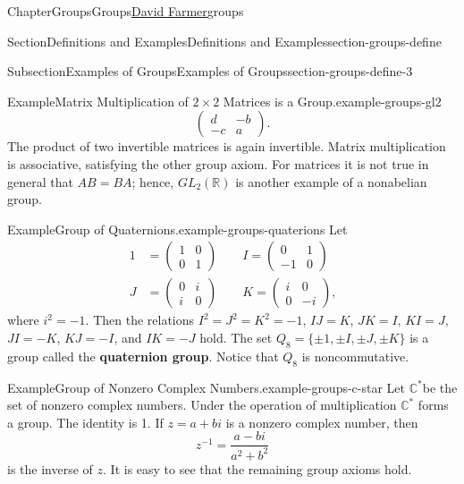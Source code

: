 \documentclass[oneside,10pt,]{book}
\newcommand{\terminology}[1]{\textbf{#1}}
\numberwithin{equation}{section}
\begin{document}
\begin{chapterptx}{Chapter}{Groups}{}{Groups}{\hyperlink{dfarmer}{David Farmer}}{}{groups}
\begin{sectionptx}{Section}{Definitions and Examples}{}{Definitions and Examples}{}{}{section-groups-define}
\begin{subsectionptx}{Subsection}{Examples of Groups}{}{Examples of Groups}{}{}{section-groups-define-3}
\begin{example}{Example}{Matrix Multiplication of \(2\times 2\) Matrices is a Group.}{example-groups-gl2}
\begin{equation*}
\begin{pmatrix}
d & -b \\
-c & a
\end{pmatrix}\text{.}
\end{equation*}
The product of two invertible matrices is again invertible. Matrix multiplication is associative, satisfying the other group axiom. For matrices it is not true in general that \(AB = BA\); hence, \(GL_2({\mathbb R})\) is another example of a nonabelian group.%
\end{example}
\begin{example}{Example}{Group of Quaternions.}{example-groups-quaterions}%
Let%
\begin{align*}
1 & = 
\begin{pmatrix}
1 & 0\\
0 & 1
\end{pmatrix}
\qquad
I
=
\begin{pmatrix}
0 & 1\\
-1 & 0
\end{pmatrix}\\
J & = 
\begin{pmatrix}
0 & i\\
i & 0
\end{pmatrix}
\qquad
K =
\begin{pmatrix}
i & 0\\
0 & -i
\end{pmatrix}\text{,}
\end{align*}
where \(i^2 = -1\). Then the relations \(I^2 = J^2 = K^2 = -1\), \(IJ=K\), \(JK = I\), \(KI = J\), \(JI = -K\), \(KJ = -I\), and \(IK = -J\) hold. The set \(Q_8 = \{\pm 1, \pm I, \pm J, \pm K  \}\) is a group called the \terminology{quaternion group}. Notice that \(Q_8\) is noncommutative.\label{example-groups-quaterions-2-13}%
\end{example}
\begin{example}{Example}{Group of Nonzero Complex Numbers.}{example-groups-c-star}%
Let \({\mathbb C}^\ast\)be the set of nonzero complex numbers. \label{example-groups-c-star-2-2} Under the operation of multiplication \({\mathbb C}^\ast\) forms a group.  The identity is 1. If \(z = a+bi\) is a nonzero complex number, then%
\begin{equation*}
z^{-1} = \frac{a -bi}{a^2 +b^2}
\end{equation*}
is the inverse of \(z\).  It is easy to see that the remaining group axioms hold.%
\end{example}

\end{subsectionptx}
\end{sectionptx}
\end{chapterptx}
\end{document}
